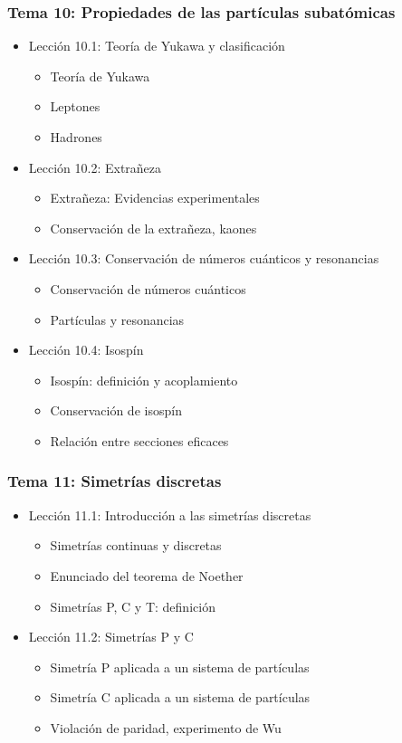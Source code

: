 \documentclass[a4paper,12pt,twoside]{article}
\begin{document}
\subsubsection*{Tema 10: Propiedades de las partículas subatómicas}
\begin{itemize}
\item Lección 10.1: Teoría de Yukawa y clasificación
\begin{itemize}
\item Teoría de Yukawa
\item Leptones
\item Hadrones
\end{itemize}
\item Lección 10.2: Extrañeza
\begin{itemize}
\item Extrañeza: Evidencias experimentales
\item Conservación de la extrañeza, kaones
\end{itemize}
\item Lección 10.3: Conservación de números cuánticos y resonancias
\begin{itemize}
\item Conservación de números cuánticos
\item Partículas y resonancias
\end{itemize}
\item Lección 10.4: Isospín
\begin{itemize}
\item Isospín: definición y acoplamiento
\item Conservación de isospín
\item Relación entre secciones eficaces
\end{itemize}
\end{itemize}

\subsubsection*{Tema 11: Simetrías discretas}
\begin{itemize}
\item Lección 11.1: Introducción a las simetrías discretas
\begin{itemize}
\item Simetrías continuas y discretas
\item Enunciado del teorema de Noether
\item Simetrías P, C y T: definición
\end{itemize}
\item Lección 11.2: Simetrías P y C
\begin{itemize}
\item Simetría P aplicada a un sistema de partículas
\item Simetría C aplicada a un sistema de partículas
\item Violación de paridad, experimento de Wu
\end{itemize}
\end{itemize}
\end{document}
